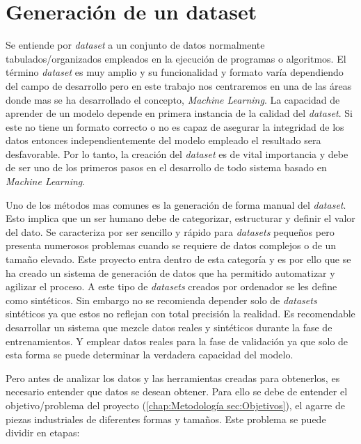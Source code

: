 \chapter{Generación de un dataset}
\label{chap:Generación de un dataset}

Se entiende por \textit{dataset} a un conjunto de datos normalmente tabulados/organizados empleados en la ejecución de programas o algoritmos. El término \textit{dataset} es muy amplio y su funcionalidad y formato varía dependiendo del campo de desarrollo pero en este trabajo nos centraremos en una de las áreas donde mas se ha desarrollado el concepto, \textit{Machine Learning}. La capacidad de aprender de un modelo depende en primera instancia de la calidad del \textit{dataset}. Si este no tiene un formato correcto o no es capaz de asegurar la integridad de los datos entonces independientemente del modelo empleado el resultado sera desfavorable. Por lo tanto, la creación del \textit{dataset} es de vital importancia y debe de ser uno de los primeros pasos en el desarrollo de todo sistema basado en \textit{Machine Learning}.

Uno de los métodos mas comunes es la generación de forma manual del \textit{dataset}. Esto implica que un ser humano debe de categorizar, estructurar y definir el valor del dato. Se caracteriza por ser sencillo y rápido para \textit{datasets} pequeños pero presenta numerosos problemas cuando se requiere de datos complejos o de un tamaño elevado. Este proyecto entra dentro de esta categoría y es por ello que se ha creado un sistema de generación de datos que ha permitido automatizar y agilizar el proceso. A este tipo de \textit{datasets} creados por ordenador se les define como sintéticos. Sin embargo no se recomienda depender solo de \textit{datasets} sintéticos ya que estos no reflejan con total precisión la realidad. Es recomendable desarrollar un sistema que mezcle datos reales y sintéticos durante la fase de entrenamientos. Y emplear datos reales para la fase de validación ya que solo de esta forma se puede determinar la verdadera capacidad del modelo.

Pero antes de analizar los datos y las herramientas creadas para obtenerlos, es necesario entender que datos se desean obtener. Para ello se debe de entender el objetivo/problema del proyecto (\ref{chap:Metodología sec:Objetivos}), el agarre de piezas industriales de diferentes formas y tamaños. Este problema se puede dividir en etapas:

